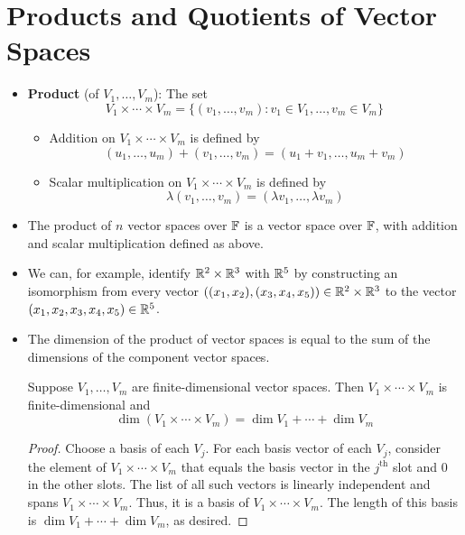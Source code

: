 \documentclass[../main.tex]{subfiles}
\begin{document}
\section{Products and Quotients of Vector Spaces}
\begin{itemize}
    \item {}\textbf{Product} (of $V_1,\dots,V_m$): The set
    \begin{equation*}
        V_1\times\cdots\times V_m = \{(v_1,\dots,v_m):v_1\in V_1,\dots,v_m\in V_m\}
    \end{equation*}
    \begin{itemize}
        \item Addition on $V_1\times\cdots\times V_m$ is defined by
        \begin{equation*}
            (u_1,\dots,u_m)+(v_1,\dots,v_m) = (u_1+v_1,\dots,u_m+v_m)
        \end{equation*}
        \item Scalar multiplication on $V_1\times\cdots\times V_m$ is defined by
        \begin{equation*}
            \lambda(v_1,\dots,v_m) = (\lambda v_1,\dots,\lambda v_m)
        \end{equation*}
    \end{itemize}
    \item The product of $n$ vector spaces over $\mathbb{F}$ is a vector space over $\mathbb{F}$, with addition and scalar multiplication defined as above.
    \item We can, for example, identify $\mathbb{R}^2\times\mathbb{R}^3$ with $\mathbb{R}^5$ by constructing an isomorphism from every vector $((x_1,x_2),(x_3,x_4,x_5))\in\mathbb{R}^2\times\mathbb{R}^3$ to the vector $(x_1,x_2,x_3,x_4,x_5)\in\mathbb{R}^5$.
    \item The dimension of the product of vector spaces is equal to the sum of the dimensions of the component vector spaces.
    \begin{theorem}\label{trm:dimensionProduct}
        Suppose $V_1,\dots,V_m$ are finite-dimensional vector spaces. Then $V_1\times\cdots\times V_m$ is finite-dimensional and
        \begin{equation*}
            \dim(V_1\times\cdots\times V_m) = \dim V_1+\cdots+\dim V_m
        \end{equation*}
        \begin{proof}
            Choose a basis of each $V_j$. For each basis vector of each $V_j$, consider the element of $V_1\times\cdots\times V_m$ that equals the basis vector in the $j^\text{th}$ slot and 0 in the other slots. The list of all such vectors is linearly independent and spans $V_1\times\cdots\times V_m$. Thus, it is a basis of $V_1\times\cdots\times V_m$. The length of this basis is $\dim V_1+\cdots+\dim V_m$, as desired.

\end{proof}
\end{theorem}
\end{itemize}
\end{document}
